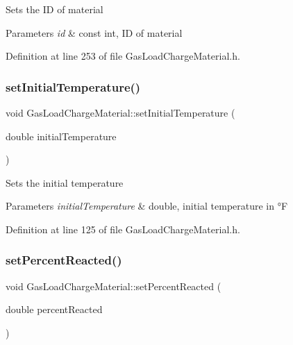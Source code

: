 Sets the ID of material 
\begin{DoxyParams}{Parameters}
{\em id} & const int, ID of material \\
\hline
\end{DoxyParams}


Definition at line 253 of file Gas\+Load\+Charge\+Material.\+h.

\mbox{\label{class_gas_load_charge_material_aec9ddfce5e31099b6a047e3d98d80d47}} 
\subsubsection{\texorpdfstring{set\+Initial\+Temperature()}{setInitialTemperature()}}
{\footnotesize\ttfamily void Gas\+Load\+Charge\+Material\+::set\+Initial\+Temperature (\begin{DoxyParamCaption}\item[{double}]{initial\+Temperature }\end{DoxyParamCaption})\hspace{0.3cm}{\ttfamily [inline]}}

Sets the initial temperature 
\begin{DoxyParams}{Parameters}
{\em initial\+Temperature} & double, initial temperature in °F \\
\hline
\end{DoxyParams}


Definition at line 125 of file Gas\+Load\+Charge\+Material.\+h.

\mbox{\label{class_gas_load_charge_material_a7142cb6bbfba53d640dd6f1590fe32f6}} 
\subsubsection{\texorpdfstring{set\+Percent\+Reacted()}{setPercentReacted()}}
{\footnotesize\ttfamily void Gas\+Load\+Charge\+Material\+::set\+Percent\+Reacted (\begin{DoxyParamCaption}\item[{double}]{percent\+Reacted }\end{DoxyParamCaption})\hspace{0.3cm}{\ttfamily [inline]}}

